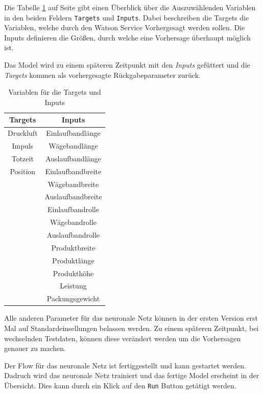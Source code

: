 Die Tabelle \ref{tab:targets_inputs} auf Seite \pageref{tab:targets_inputs} gibt einen Überblick über die Auszuwählenden
Variablen in den beiden Feldern \texttt{Targets} und \texttt{Inputs}. Dabei beschreiben die Targets die Variablen, welche
durch den Watson Service Vorhergesagt werden sollen. Die Inputs definieren die Größen, durch welche eine Vorhersage
überhaupt möglich ist.

Das Model wird zu einem späteren Zeitpunkt mit den \textit{Inputs} gefüttert und die \textit{Targets} kommen als
vorhergesagte Rückgabeparameter zurück.

\begin{table}[hb]
    \centering
    \begin{tabular}{|c|c|}
        \hline
        \textbf{Targets} & \textbf{Inputs}\\
        \hline
        \hline
        Druckluft & Einlaufbandlänge\\
        \hline
        Impuls & Wägebandlänge\\
        \hline
        Totzeit & Auslaufbandlänge\\
        \hline
        Position & Einlaufbandbreite\\
        \hline
         & Wägebandbreite\\
        \hline
        & Auslaufbandbreite\\
        \hline
        & Einlaufbandrolle\\
        \hline
        & Wägebandrolle\\
        \hline
        & Auslaufbandrolle\\
        \hline
        & Produktbreite\\
        \hline
        & Produktlänge\\
        \hline
        & Produkthöhe\\
        \hline
        & Leistung\\
        \hline
        & Packungsgewicht\\
        \hline
    \end{tabular}
    \caption{Variablen für die Targets und Inputs}
    \label{tab:targets_inputs}
\end{table}

Alle anderen Parameter für das neuronale Netz können in der ersten Version erst Mal auf Standardeinsellungen belassen
werden. Zu einem späteren Zeitpunkt, bei wechselnden Testdaten, können diese verändert werden um die Vorhersagen
genauer zu machen.

Der Flow für das neuronale Netz ist fertiggestellt und kann gestartet werden. Dadruch wird das neuronale Netz trainiert
und das fertige Model erscheint in der Übersicht. Dies kann durch ein Klick auf den \texttt{Run} Button getätigt werden.

